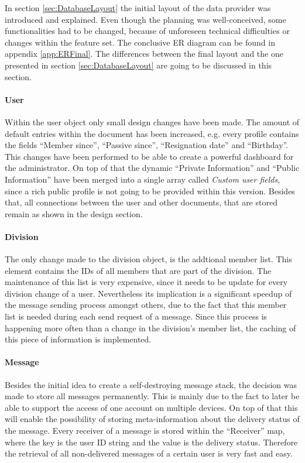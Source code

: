 In section \vref{sec:DatabaseLayout} the initial layout of the data provider was introduced and explained. Even though the planning was well-conceived, some functionalities had to be changed, because of unforeseen technical difficulties or changes within the feature set. The conclusive \gls{ER} diagram can be found in appendix \vref{app:ERFinal}. The differences between the final layout and the one presented in section \vref{sec:DatabaseLayout} are going to be discussed in this section.

\paragraph{User}
Within the user object only small design changes have been made. The amount of default entries within the document has been increased, e.g. every profile contains the fields \enquote{Member since}, \enquote{Passive since}, \enquote{Resignation date} and \enquote{Birthday}. This changes have been performed to be able to create a powerful dashboard for the administrator. On top of that the dynamic \enquote{Private Information} and \enquote{Public Information} have been merged into a single array called \emph{Custom user fields}, since a rich public profile is not going to be provided within this version. Besides that, all connections between the user and other documents, that are stored remain as shown in the design section.

\paragraph{Division}
The only change made to the division object, is the addtional member list. This element contains the IDs of all members that are part of the division. The maintenance of this list is very expensive, since it needs to be update for every division change of a user. Nevertheless its implication is a significant speedup of the message sending process amongst others, due to the fact that this member list is needed during each send request of a message. Since this process is happening more often than a change in the division's member list, the caching of this piece of information is implemented. 

\paragraph{Message}

Besides the initial idea to create a self-destroying message stack, the decision was made to store all messages permanently. This is mainly due to the fact to later be able to support the access of one account on multiple devices. On top of that this will enable the possibility of storing meta-information about the delivery status of the message. Every receiver of a message is stored within the \enquote{Receiver} map, where the key is the user ID string and the value is the delivery status. Therefore the retrieval of all non-delivered messages of a certain user is very fast and easy.

